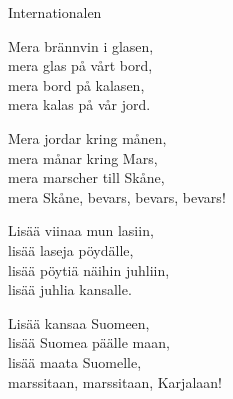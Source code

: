 \begin{song}{Internationalen}
	
	
	
	
	Mera brännvin i glasen,\\
	mera glas på vårt bord,\\
	mera bord på kalasen,\\
	mera kalas på vår jord.
	
	Mera jordar kring månen,\\
	mera månar kring Mars,\\
	mera marscher till Skåne,\\
	mera Skåne, bevars, bevars, bevars!
	
	Lisää viinaa mun lasiin,\\
	lisää laseja pöydälle,\\
	lisää pöytiä näihin juhliin,\\
	lisää juhlia kansalle.
	
	Lisää kansaa Suomeen,\\
	lisää Suomea päälle maan,\\
	lisää maata Suomelle,\\
	marssitaan, marssitaan, Karjalaan!
	
\end{song}
